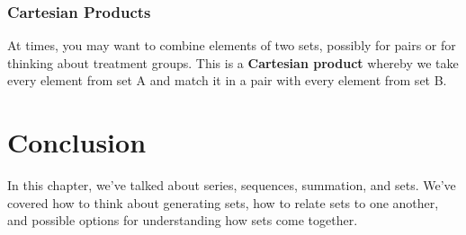 \documentclass[
]{book}
\begin{document}
\hypertarget{cartesian-products}{%
\subsubsection{Cartesian Products}\label{cartesian-products}}

At times, you may want to combine elements of two sets, possibly for pairs or for thinking about treatment groups. This is a \textbf{Cartesian product} whereby we take every element from set A and match it in a pair with every element from set B.

\hypertarget{conclusion-1}{%
\section{Conclusion}\label{conclusion-1}}

In this chapter, we've talked about series, sequences, summation, and sets. We've covered how to think about generating sets, how to relate sets to one another, and possible options for understanding how sets come together.

  
\end{document}
